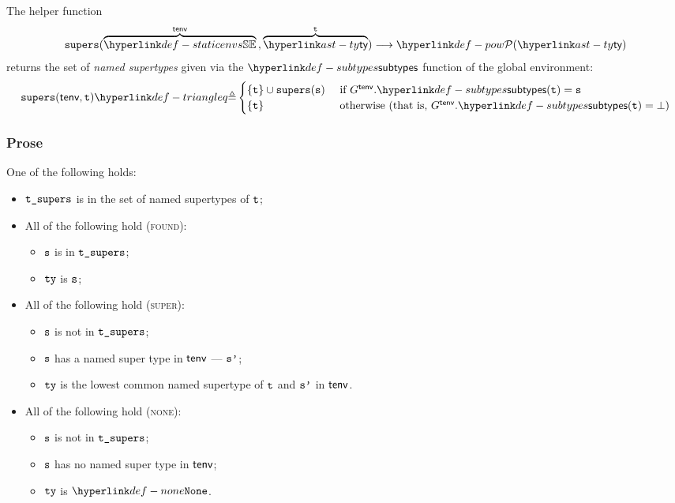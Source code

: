 \newcommand\supers[0]{\texttt{supers}}
The helper function
\[
  \supers(\overname{\staticenvs}{\tenv} \aslsep \overname{\ty}{\vt})
  \aslto \pow{\ty}
\]
returns the set of \emph{named supertypes} given via the $\subtypes$ function of the global environment:
\[
  \supers(\tenv, \vt) \triangleq
  \begin{cases}
    \{\vt\} \cup \supers(\vs) & \text{ if }G^\tenv.\subtypes(\vt) = \vs\\
    \{\vt\}  & \text{ otherwise } (\text{that is, }G^\tenv.\subtypes(\vt) = \bot)\\
  \end{cases}
\]

\subsubsection{Prose}
One of the following holds:
\begin{itemize}
  \item $\texttt{t\_supers}$ is in the set of named supertypes of $\texttt{t}$;
  \item All of the following hold (\textsc{found}):
  \begin{itemize}
    \item $\texttt{s}$ is in $\texttt{t\_supers}$;
    \item $\texttt{ty}$ is $\texttt{s}$;
  \end{itemize}

  \item All of the following hold (\textsc{super}):
  \begin{itemize}
    \item $\texttt{s}$ is not in $\texttt{t\_supers}$;
    \item $\texttt{s}$ has a named super type in $\textsf{tenv}$ --- $\texttt{s'}$;
    \item $\texttt{ty}$ is the lowest common named supertype of $\texttt{t}$ and $\texttt{s'}$ in $\textsf{tenv}$.
  \end{itemize}

  \item All of the following hold (\textsc{none}):
  \begin{itemize}
    \item $\texttt{s}$ is not in $\texttt{t\_supers}$;
    \item $\texttt{s}$ has no named super type in $\textsf{tenv}$;
    \item $\texttt{ty}$ is $\None$.
  \end{itemize}
\end{itemize}

